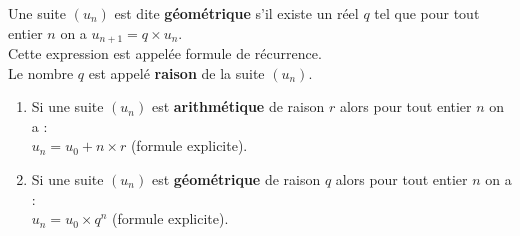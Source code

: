 \documentclass[a4paper,11pt,exos]{nsi} %
\begin{document}
\begin{definition}[]
	Une suite $(u_n)$ est dite \textbf{géométrique} s'il existe un réel $q$ tel que pour tout entier $n$ on a  $u_{n+1}=q\times u_n$.\\
	Cette expression est appelée formule de récurrence.\\
	Le nombre $q$ est appelé \textbf{raison} de la suite $(u_n)$.
\end{definition}

\begin{propriete}[s]
\begin{enumerate}[label=\textbullet]
	\item 	Si une suite $(u_n)$ est \textbf{arithmétique} de raison $r$ alors pour tout entier $n$ on a :\\
	$u_n=u_0+n\times r$ (formule explicite).
	\item 	Si une suite $(u_n)$ est \textbf{géométrique} de raison $q$ alors pour tout entier $n$ on a :\\
	$u_n=u_0\times q^n$ (formule explicite).
\end{enumerate}
\end{propriete}
\end{document}
